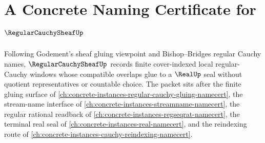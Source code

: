 \chapter{A Concrete Naming Certificate for $\RegularCauchySheafUp$}
\label{ch:concrete-instances-regular-cauchy-sheaf-namecert}

Following Godement's sheaf gluing viewpoint and Bishop--Bridges regular Cauchy names, $\RegularCauchySheafUp$ records finite cover-indexed local regular-Cauchy windows whose compatible overlaps glue to a $\RealUp$ seal without quotient representatives or countable choice. The packet sits after the finite gluing surface of \autoref{ch:concrete-instances-regular-cauchy-gluing-namecert}, the stream-name interface of \autoref{ch:concrete-instances-streamname-namecert}, the regular rational readback of \autoref{ch:concrete-instances-regseqrat-namecert}, the terminal real seal of \autoref{ch:concrete-instances-real-namecert}, and the reindexing route of \autoref{ch:concrete-instances-cauchy-reindexing-namecert}.

